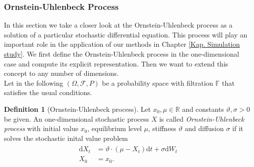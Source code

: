 \documentclass[11pt,titlepage]{article}
\newcommand{\R}{\mathbb{R}} %
\theoremstyle{definition}
\newtheorem{definition}[theorem]{Definition}
\theoremstyle{remark}
\begin{document}
	
	\subsubsection{Ornstein-Uhlenbeck Process} \label{Ornstein-Uhlenbeck background}
	
	In this section we take a closer look at the Ornstein-Uhlenbeck process as a solution 
	of a particular stochastic differential equation. This process will play an important role in the application of our methods in Chapter \ref{Kap. Simulation study}. We first define the Ornstein-Uhlenbeck process in the one-dimensional case and compute its explicit representation. Then we want to extend this concept to any number of dimensions.\\
	Let in the following $(\Omega, \mathcal{F}, P)$ be a probability space with filtration $\mathbb{F}$ 
	that satisfies the usual conditions.
	\begin{definition}[Ornstein-Uhlenbeck process]\label{Def 1dim OUP}
		Let $x_0,\mu\in\R$ and constants $\vartheta,\sigma>0$ be given. An one-dimensional stochastic process $X$ is called 
		\textsl{Ornstein-Uhlenbeck process} with initial value $x_0$, equilibrium level $\mu$, stiffness  $\vartheta$ and diffusion $\sigma$ if it solves the stochastic inital value problem 
		\begin{align}
			\begin{split}
				\mathrm{d}X_t &= \vartheta\cdot (\mu-X_t)\mathrm{d}t +\sigma \mathrm{d}W_t\\
				X_0&=x_0. \label{SDE eines 1dim OUP}
			\end{split}
		\end{align}
	\end{definition}
	\noindent
	
\end{document}
